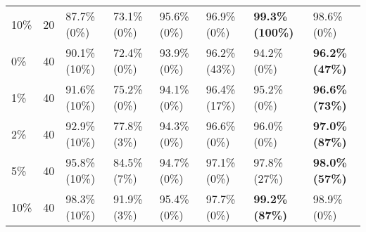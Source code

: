 \begin{table}[ht]
\begin{tabular}{lrllllll}
  10\% &  20 & 87.7\% (0\%) & 73.1\% (0\%) & 95.6\% (0\%) & 96.9\% (0\%) & \textbf{99.3\% (100\%)} & 98.6\% (0\%) \\ 
  0\% &  40 & 90.1\% (10\%) & 72.4\% (0\%) & 93.9\% (0\%) & 96.2\% (43\%) & 94.2\% (0\%) & \textbf{96.2\% (47\%)} \\ 
  1\% &  40 & 91.6\% (10\%) & 75.2\% (0\%) & 94.1\% (0\%) & 96.4\% (17\%) & 95.2\% (0\%) & \textbf{96.6\% (73\%)} \\ 
  2\% &  40 & 92.9\% (10\%) & 77.8\% (3\%) & 94.3\% (0\%) & 96.6\% (0\%) & 96.0\% (0\%) & \textbf{97.0\% (87\%)} \\ 
  5\% &  40 & 95.8\% (10\%) & 84.5\% (7\%) & 94.7\% (0\%) & 97.1\% (0\%) & 97.8\% (27\%) & \textbf{98.0\% (57\%)} \\ 
  10\% &  40 & 98.3\% (10\%) & 91.9\% (3\%) & 95.4\% (0\%) & 97.7\% (0\%) & \textbf{99.2\% (87\%)} & 98.9\% (0\%) \\ 
   \hline
\end{tabular}
\end{table}
